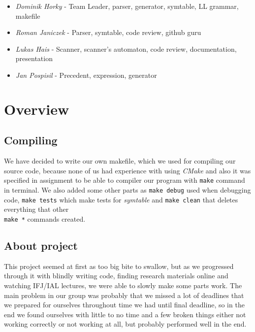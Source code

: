 \documentclass[11pt, titlepage]{article}
\begin{document}
\begin{itemize}[itemsep=-5pt]
\item
  \emph{Dominik Horky} - Team Leader, parser, generator, symtable, LL
  grammar, makefile
\item
  \emph{Roman Janiczek} - Parser, symtable, code review, github guru
\item
  \emph{Lukas Hais} - Scanner, scanner's automaton, code review,
  documentation, presentation
\item
  \emph{Jan Pospisil} - Precedent, expression, generator
\end{itemize}





\section{Overview}\label{overview}

\subsection{Compiling}\label{compiling}

We have decided to write our own makefile, which we used for compiling
our source code, because none of us had experience with using
\emph{CMake} and also it was specified in assignment to be able to
compiler our program with \texttt{make} command in terminal. We also
added some other parts as \texttt{make\ debug} used when debugging code,
\texttt{make\ tests} which make tests for \emph{symtable} and
\texttt{make\ clean} that deletes everything that other \\\texttt{make\ *}
commands created.

\subsection{About project}\label{about-project}

This project seemed at first as too big bite to swallow, but as we
progressed through it with blindly writing code, finding research
materials online and watching IFJ/IAL lectures, we were able to slowly
make some parts work. The main problem in our group was probably that we
missed a lot of deadlines that we prepared for ourselves throughout time
we had until final deadline, so in the end we found ourselves with
little to no time and a few broken things either not working correctly
or not working at all, but probably performed well in the end.
\end{document}
